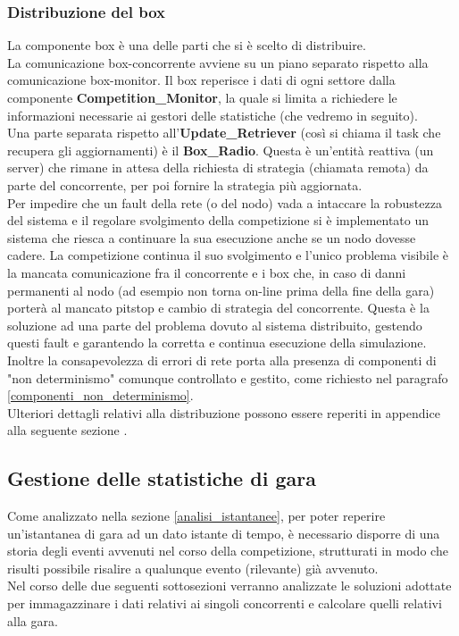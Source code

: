      \subsubsection{Distribuzione del box}
La componente box è una delle parti che si è scelto di distribuire.\\
La comunicazione box-concorrente avviene su un piano separato rispetto alla comunicazione box-monitor.
Il box reperisce i dati di ogni settore dalla componente \textbf{Competition\_Monitor}, la quale si limita
a richiedere le informazioni necessarie ai gestori delle statistiche (che vedremo in seguito).\\
Una parte separata rispetto all'\textbf{Update\_Retriever} (così si chiama il task che recupera gli aggiornamenti) è
il \textbf{Box\_Radio}. Questa è un'entità reattiva (un server) che rimane in attesa della richiesta di strategia (chiamata remota)
da parte del concorrente, per poi fornire la strategia più aggiornata.\\
Per impedire che un fault della rete (o del nodo) vada a intaccare la robustezza
del sistema e il regolare svolgimento della competizione si è implementato un sistema che riesca a continuare la
sua esecuzione anche se un nodo dovesse cadere. La competizione continua il suo
svolgimento e l'unico problema visibile è la mancata comunicazione fra il
concorrente e i box che, in caso di danni permanenti al nodo (ad esempio non
torna on-line prima della fine della gara) porterà al mancato pitstop e cambio
di strategia del concorrente. Questa è la soluzione ad una parte del problema
dovuto al sistema distribuito, gestendo questi fault e garantendo la corretta e
continua esecuzione della simulazione.
Inoltre la consapevolezza di errori di rete porta alla presenza di componenti di
"non determinismo" comunque controllato e gestito, come richiesto nel paragrafo
\ref{componenti_non_determinismo}.\\
Ulteriori dettagli relativi alla distribuzione possono essere reperiti in appendice alla seguente sezione \label{distribuzione}.
\subsection{Gestione delle statistiche di gara}
\label{statistiche}
Come analizzato nella sezione \ref{analisi_istantanee}, per poter reperire
un'istantanea di gara ad un dato istante di tempo, è necessario
disporre di una storia degli eventi avvenuti nel corso della competizione,
strutturati in modo che risulti possibile risalire a qualunque evento
(rilevante) già avvenuto.\\ 
Nel corso delle due seguenti sottosezioni verranno analizzate le soluzioni
adottate per immagazzinare i dati relativi ai singoli concorrenti
e calcolare quelli relativi alla gara.
